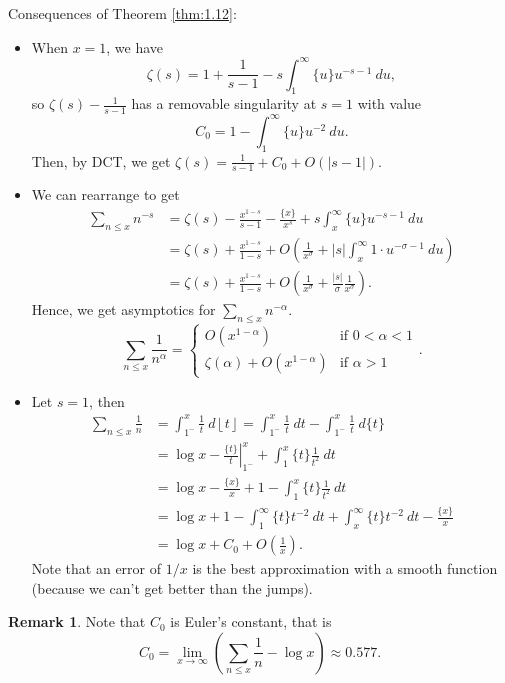 \documentclass[11pt]{article}
\theoremstyle{definition}
\newtheorem{remark}[thm]{Remark}
\newcommand{\floor}[1]{\left\lfloor #1 \right\rfloor}
\newcommand{\s}[0]{\sigma}
\newcommand{\abs}[1]{\left\lvert#1\right\rvert} %
\begin{document}
Consequences of Theorem \ref{thm:1.12}:
\begin{itemize}
\item When $x=1$, we have
\[
\zeta(s) = 1 + \frac1{s-1} - s\int_1^\infty \{u\}u^{-s-1} ~du ,
\]
so $\zeta(s)-\frac1{s-1}$ has a removable singularity at $s=1$ with value
\[
C_0 = 1 - \int_1^\infty \{u\} u^{-2} ~du .
\]
Then, by DCT, we get $\zeta(s)=\frac1{s-1}+C_0 + O(\abs{s-1})$.

\item We can rearrange to get
\begin{align*}
\sum_{n\le x}n^{-s}
&= \zeta(s) - \frac{x^{1-s}}{s-1} - \frac{\{x\}}{x^s} + s\int_x^\infty\{u\}u^{-s-1}~du \\
&= \zeta(s) + \frac{x^{1-s}}{1-s}
+ O\left(\frac1{x^\s}+\abs{s}\int_x^\infty1\cdot u^{-\s-1}~du\right) \\
&= \zeta(s) + \frac{x^{1-s}}{1-s}
+ O\left(\frac1{x^\s}+\frac{\abs{s}}\s\frac1{x^\s}\right) .
\end{align*}
Hence, we get asymptotics for $\sum_{n\le x}n^{-\alpha}$.
\[
\sum_{n\le x}\frac1{n^\alpha} = \begin{cases}
O(x^{1-\alpha}) &\text{if }0<\alpha<1 \\
\zeta(\alpha)+O(x^{1-\alpha}) &\text{if }\alpha>1
\end{cases} .
\]

\item Let $s=1$, then
\begin{align*}
\sum_{n\le x}\frac1n &= \int_{1^-}^x\frac1t~d\floor{t}
= \int_{1^-}^x\frac1t~dt - \int_{1^-}^x\frac1t~d\{t\} \\
&= \log x - \left.\frac{\{t\}}t\right|_{1^-}^x + \int_1^x\{t\}\frac1{t^2}~dt \\
&= \log x - \frac{\{x\}}x + 1 - \int_1^x\{t\}\frac1{t^2}~dt \\
&= \log x + 1-\int_1^\infty\{t\}t^{-2}~dt + \int_x^\infty\{t\}t^{-2}~dt - \frac{\{x\}}x \\
&= \log x + C_0 + O\left(\frac1x\right) .
\end{align*}
Note that an error of $1/x$ is the best approximation with a smooth function (because we
can't get better than the jumps).

\end{itemize}

\begin{remark}
Note that $C_0$ is Euler's constant, that is
\[
C_0 = \lim_{x\to\infty}\left(\sum_{n\le x}\frac1n - \log x\right) \approx 0.577 .
\]
\end{remark}
\end{document}
